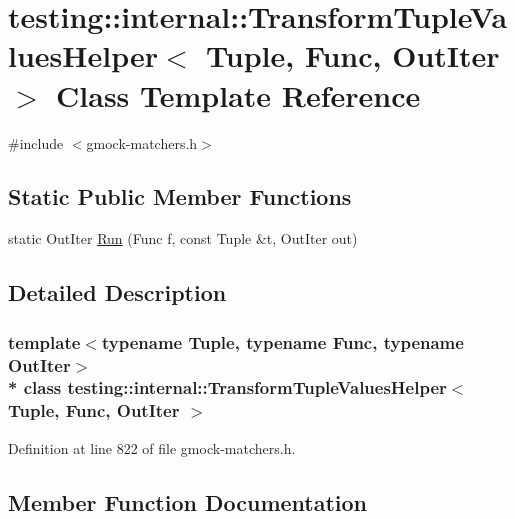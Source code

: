 \hypertarget{classtesting_1_1internal_1_1_transform_tuple_values_helper}{}\section{testing\+:\+:internal\+:\+:Transform\+Tuple\+Values\+Helper$<$ Tuple, Func, Out\+Iter $>$ Class Template Reference}
\label{classtesting_1_1internal_1_1_transform_tuple_values_helper}


{\ttfamily \#include $<$gmock-\/matchers.\+h$>$}

\subsection*{Static Public Member Functions}
\begin{DoxyCompactItemize}
\item 
static Out\+Iter \hyperlink{classtesting_1_1internal_1_1_transform_tuple_values_helper_a27773f284f43c712ec72923a872d35fc}{Run} (Func f, const Tuple \&t, Out\+Iter out)
\end{DoxyCompactItemize}


\subsection{Detailed Description}
\subsubsection*{template$<$typename Tuple, typename Func, typename Out\+Iter$>$\\*
class testing\+::internal\+::\+Transform\+Tuple\+Values\+Helper$<$ Tuple, Func, Out\+Iter $>$}



Definition at line 822 of file gmock-\/matchers.\+h.



\subsection{Member Function Documentation}
